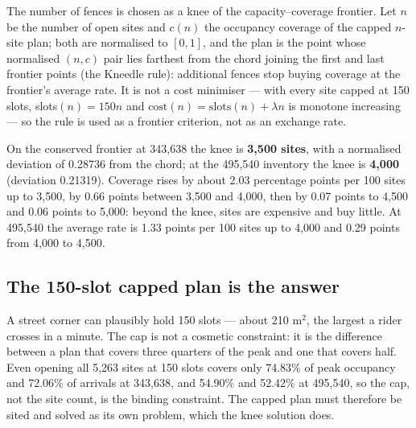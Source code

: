 The number of fences is chosen as a knee of the capacity--coverage frontier. Let $n$ be
the number of open sites and $c(n)$ the occupancy coverage of the capped $n$-site plan;
both are normalised to $[0,1]$, and the plan is the point whose normalised $(n,c)$ pair
lies farthest from the chord joining the first and last frontier points (the Kneedle
rule): additional fences stop buying coverage at the frontier's average rate. It is not
a cost minimiser --- with every site capped at 150 slots, slots$(n)=150n$ and
$\text{cost}(n)=\text{slots}(n)+\lambda n$ is monotone increasing --- so the rule is used
as a frontier criterion, not as an exchange rate.

On the conserved frontier at 343,638 the knee is \textbf{3,500 sites}, with a normalised
deviation of 0.28736 from the chord; at the 495,540 inventory the knee is \textbf{4,000}
(deviation 0.21319). Coverage rises by about 2.03 percentage points per 100 sites up to
3,500, by 0.66 points between 3,500 and 4,000, then by 0.07 points to 4,500 and 0.06
points to 5,000: beyond the knee, sites are expensive and buy little. At 495,540 the
average rate is 1.33 points per 100 sites up to 4,000 and 0.29 points from 4,000 to
4,500.

\subsection{The 150-slot capped plan is the answer}

A street corner can plausibly hold 150 slots --- about 210 m$^2$, the largest a rider
crosses in a minute. The cap is not a cosmetic constraint: it is the difference between
a plan that covers three quarters of the peak and one that covers half. Even opening all
5,263 sites at 150 slots covers only 74.83\% of peak occupancy and 72.06\% of arrivals
at 343,638, and 54.90\% and 52.42\% at 495,540, so the cap, not the site count, is the
binding constraint. The capped plan must therefore be sited and solved as its own
problem, which the knee solution does.

